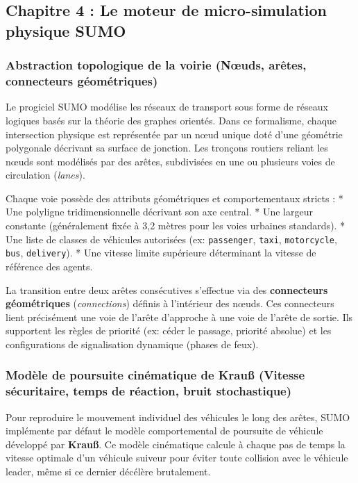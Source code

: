 \documentclass[11pt, a4paper]{article}
\begin{document}
\subsection{Chapitre 4 : Le moteur de micro-simulation physique
SUMO}\label{chapitre-4-le-moteur-de-micro-simulation-physique-sumo}

\subsubsection{Abstraction topologique de la voirie (Nœuds, arêtes,
connecteurs
géométriques)}\label{abstraction-topologique-de-la-voirie-nux153uds-aruxeates-connecteurs-guxe9omuxe9triques}

Le progiciel SUMO modélise les réseaux de transport sous forme de
réseaux logiques basés sur la théorie des graphes orientés. Dans ce
formalisme, chaque intersection physique est représentée par un nœud
unique doté d'une géométrie polygonale décrivant sa surface de jonction.
Les tronçons routiers reliant les nœuds sont modélisés par des arêtes,
subdivisées en une ou plusieurs voies de circulation (\emph{lanes}).

Chaque voie possède des attributs géométriques et comportementaux
stricts : * Une polyligne tridimensionnelle décrivant son axe central. *
Une largeur constante (généralement fixée à 3,2 mètres pour les voies
urbaines standards). * Une liste de classes de véhicules autorisées (ex:
\texttt{passenger}, \texttt{taxi}, \texttt{motorcycle}, \texttt{bus},
\texttt{delivery}). * Une vitesse limite supérieure déterminant la
vitesse de référence des agents.

La transition entre deux arêtes consécutives s'effectue via des
\textbf{connecteurs géométriques} (\emph{connections}) définis à
l'intérieur des nœuds. Ces connecteurs lient précisément une voie de
l'arête d'approche à une voie de l'arête de sortie. Ils supportent les
règles de priorité (ex: céder le passage, priorité absolue) et les
configurations de signalisation dynamique (phases de feux).

\subsubsection{Modèle de poursuite cinématique de Krauß (Vitesse
sécuritaire, temps de réaction, bruit
stochastique)}\label{moduxe8le-de-poursuite-cinuxe9matique-de-krauuxdf-vitesse-suxe9curitaire-temps-de-ruxe9action-bruit-stochastique}

Pour reproduire le mouvement individuel des véhicules le long des
arêtes, SUMO implémente par défaut le modèle comportemental de poursuite
de véhicule développé par \textbf{Krauß}. Ce modèle cinématique calcule
à chaque pas de temps la vitesse optimale d'un véhicule suiveur pour
éviter toute collision avec le véhicule leader, même si ce dernier
décélère brutalement.
\end{document}
